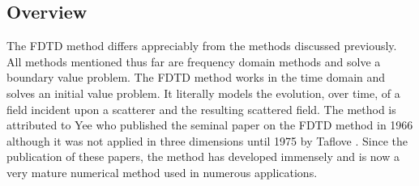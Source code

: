 \documentclass[a4paper, 12pt]{article}
\begin{document}
	\subsection{Overview}
	\label{sec:numermeth:fdtd}
	The FDTD method differs appreciably
	from the methods discussed previously. All methods mentioned thus far
	are frequency domain methods and solve a boundary value problem. The
	FDTD method works in the time domain and solves an initial value
	problem. It literally models the evolution, over time, of a field
	incident upon a scatterer and the resulting scattered field. The
	method is attributed to Yee \cite{yee66ieeetransantprop302} who
	published the seminal paper on the FDTD method in 1966 although it
	was not applied in three dimensions until 1975 by Taflove
	\cite{taflove75ieeetransmicrotheoryandtech623,taflove75ieeetransmicrotheoryandtech888}.
	Since the publication of these papers, the method has developed
	immensely and is now a very mature numerical method used in numerous
	applications.
	
\end{document}
